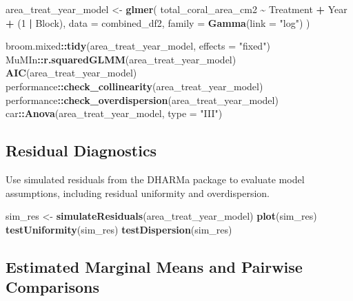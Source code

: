 \documentclass[
]{article}
\newenvironment{Shaded}{\begin{snugshade}}{\end{snugshade}}
\newcommand{\AttributeTok}[1]{\textcolor[rgb]{0.13,0.29,0.53}{#1}}
\newcommand{\DecValTok}[1]{\textcolor[rgb]{0.00,0.00,0.81}{#1}}
\newcommand{\FunctionTok}[1]{\textcolor[rgb]{0.13,0.29,0.53}{\textbf{#1}}}
\newcommand{\NormalTok}[1]{#1}
\newcommand{\OtherTok}[1]{\textcolor[rgb]{0.56,0.35,0.01}{#1}}
\newcommand{\SpecialCharTok}[1]{\textcolor[rgb]{0.81,0.36,0.00}{\textbf{#1}}}
\newcommand{\StringTok}[1]{\textcolor[rgb]{0.31,0.60,0.02}{#1}}
\begin{document}
\begin{Shaded}
\begin{Highlighting}[]
\NormalTok{area\_treat\_year\_model }\OtherTok{\textless{}{-}} \FunctionTok{glmer}\NormalTok{(}
\NormalTok{  total\_coral\_area\_cm2 }\SpecialCharTok{\textasciitilde{}}
\NormalTok{    Treatment }\SpecialCharTok{+}
\NormalTok{    Year }\SpecialCharTok{+}
\NormalTok{    (}\DecValTok{1} \SpecialCharTok{|}\NormalTok{ Block),}
  \AttributeTok{data =}\NormalTok{ combined\_df2,}
  \AttributeTok{family =} \FunctionTok{Gamma}\NormalTok{(}\AttributeTok{link =} \StringTok{"log"}\NormalTok{)}
\NormalTok{)}

\NormalTok{broom.mixed}\SpecialCharTok{::}\FunctionTok{tidy}\NormalTok{(area\_treat\_year\_model, }\AttributeTok{effects =} \StringTok{"fixed"}\NormalTok{)}
\NormalTok{MuMIn}\SpecialCharTok{::}\FunctionTok{r.squaredGLMM}\NormalTok{(area\_treat\_year\_model)}
\FunctionTok{AIC}\NormalTok{(area\_treat\_year\_model)}
\NormalTok{performance}\SpecialCharTok{::}\FunctionTok{check\_collinearity}\NormalTok{(area\_treat\_year\_model)}
\NormalTok{performance}\SpecialCharTok{::}\FunctionTok{check\_overdispersion}\NormalTok{(area\_treat\_year\_model)}
\NormalTok{car}\SpecialCharTok{::}\FunctionTok{Anova}\NormalTok{(area\_treat\_year\_model, }\AttributeTok{type =} \StringTok{"III"}\NormalTok{)}
\end{Highlighting}
\end{Shaded}

\subsection{Residual Diagnostics}\label{residual-diagnostics}

Use simulated residuals from the DHARMa package to evaluate model
assumptions, including residual uniformity and overdispersion.

\begin{Shaded}
\begin{Highlighting}[]
\NormalTok{sim\_res }\OtherTok{\textless{}{-}} \FunctionTok{simulateResiduals}\NormalTok{(area\_treat\_year\_model)}
\FunctionTok{plot}\NormalTok{(sim\_res)}
\FunctionTok{testUniformity}\NormalTok{(sim\_res)}
\FunctionTok{testDispersion}\NormalTok{(sim\_res)}
\end{Highlighting}
\end{Shaded}

\subsection{Estimated Marginal Means and Pairwise
Comparisons}\label{estimated-marginal-means-and-pairwise-comparisons}
\end{document}
